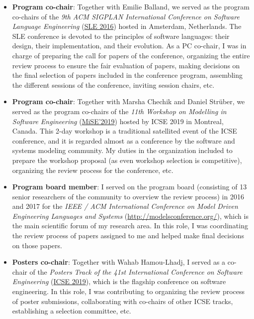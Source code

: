 \begin{itemize}[leftmargin=0.5cm]
\item \textbf{Program co-chair}: Together with Emilie Balland, we served as the program co-chairs of the \emph{9th ACM SIGPLAN International Conference on Software Language Engineering} (\href{https://www.sleconf.org/2016/}{SLE 2016}) hosted in Amsterdam, Netherlands. The SLE conference is devoted to the principles of software languages: their design, their implementation, and their evolution. As a PC co-chair, I was in charge of preparing the call for papers of the conference, organizing the entire review process to ensure the fair evaluation of papers, making decisions on the final selection of papers included in the conference program, assembling the different sessions of the conference, inviting session chairs, etc. 

\item \textbf{Program co-chair}: Together with Marsha Chechik and Daniel Strüber, we served as the program co-chairs of the \emph{11th Workshop on Modelling in Software Engineering} (\href{https://sselab.de/lab2/public/wiki/MiSE/index.php}{MiSE’2019}) hosted by ICSE 2019 in Montreal, Canada. This 2-day workshop is a traditional satellited event of the ICSE conference, and it is regarded almost as a conference by the software and systems modeling community. My duties in the organization included to prepare the workshop proposal (as even workshop selection is competitive), organizing the review process for the conference, etc.

\item \textbf{Program board member}: I served on the program board (consisting of 13 senior researchers of the community to overview the review process) in 2016 and 2017 for the \emph{IEEE / ACM International Conference on Model Driven Engineering Languages and Systems} (\href{MODELS}{http://modelsconference.org/}), which is the main scientific forum of my research area. In this role, I was coordinating the review process of papers assigned to me and helped make final decisions on those papers.

\item \textbf{Posters co-chair}: Together with Wahab Hamou-Lhadj, I served as a co-chair of the \emph{Posters Track of the 41st International Conference on Software Engineering} 
(\href{https://2019.icse-conferences.org/track/icse-2019-Posters}{ICSE 2019}), which is the flagship conference on software engineering. In this role, I was contributing to organizing the review process of poster submissions, collaborating with co-chairs of other ICSE tracks, establishing a selection committee, etc.


\end{itemize}
